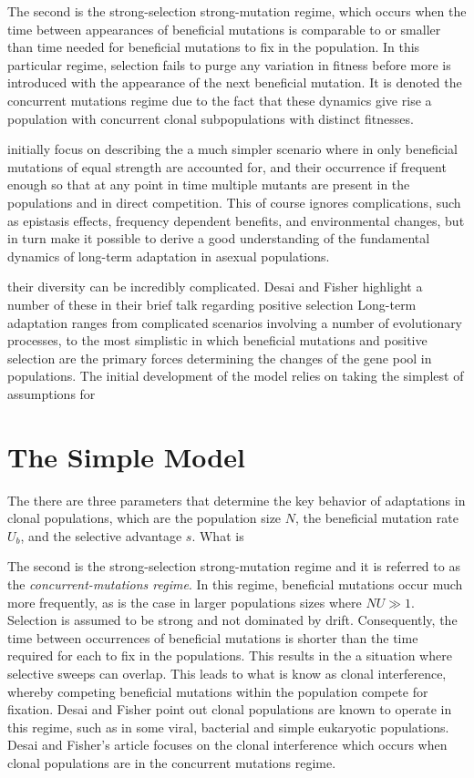 \documentclass[12pt,twocolumn]{article}
\begin{document}
The second is the strong-selection strong-mutation regime, which occurs when the time between appearances of beneficial mutations is comparable to or smaller than time needed for beneficial mutations to fix in the population.  In this particular regime, selection fails to purge any variation in fitness before more is introduced with the appearance of the next beneficial mutation.  It is denoted the concurrent mutations regime due to the fact that these dynamics give rise a population with concurrent clonal subpopulations with distinct fitnesses.     

initially focus on describing the a much simpler scenario where in only beneficial mutations of equal strength are accounted for, and their occurrence if frequent enough so that at any point in time multiple mutants are present in the populations and in direct competition.  This of course ignores complications, such as epistasis effects, frequency dependent benefits, and environmental changes, but in turn make it possible to derive a good understanding of the fundamental dynamics of long-term adaptation in asexual populations.  

their diversity can be incredibly complicated.  Desai and Fisher highlight a number of these in their brief talk regarding positive selection Long-term adaptation ranges from complicated scenarios involving a number of evolutionary processes, to the most simplistic in which beneficial mutations and positive selection are the primary forces determining the changes of the gene pool in populations.  The initial development of the model relies on taking the simplest of assumptions for 

\section{The Simple Model}
The there are three parameters that determine the key behavior of adaptations in clonal populations, which are the population size $N$, the beneficial mutation rate $U_b$, and the selective advantage $s$.  What is  

The second is the strong-selection strong-mutation regime and it is referred to as the \textit{concurrent-mutations regime}. In this regime, beneficial mutations occur much more frequently, as is the case in larger populations sizes where $NU \gg 1$.  Selection is assumed to be strong and not dominated by drift.  Consequently, the time between occurrences of beneficial mutations is shorter than the time required for each to fix in the populations.  This results in the a situation where selective sweeps can overlap. This leads to what is know as clonal interference, whereby competing beneficial mutations within the population compete for fixation. Desai and Fisher point out clonal populations are known to operate in this regime, such as in some viral, bacterial and simple eukaryotic populations.  Desai and Fisher's article focuses on the clonal interference which occurs when clonal populations are in the concurrent mutations regime.  
\end{document}
